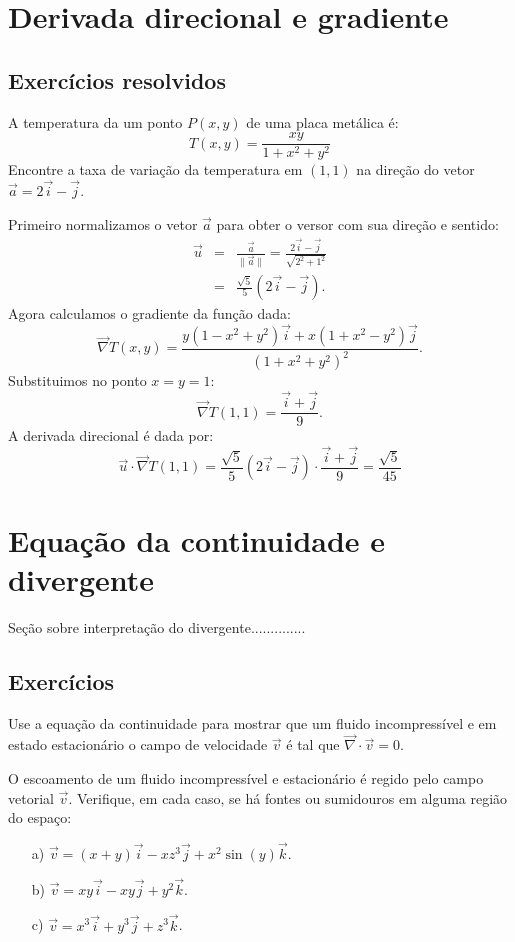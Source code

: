 \section{Derivada direcional e gradiente}


\subsection*{Exercícios resolvidos}
\begin{exeresol}
A temperatura da um ponto $P(x, y)$ de uma placa metálica é:
$$T(x, y) = \frac{xy}{1+x^2+y^2}$$
Encontre a taxa de variação da temperatura em $(1, 1)$ na direção do vetor $\vec{a}=2\vec{i}-\vec{j}$.
\end{exeresol}
\begin{resol}
Primeiro normalizamos o vetor $\vec{a}$ para obter o versor com sua direção e sentido:
\begin{eqnarray*}
\vec{u}&=&\frac{\vec{a}}{\|\vec{a}\|}=\frac{2\vec{i}-\vec{j}}{\sqrt{2^2+1^2}}\\
&=&\frac{\sqrt{5}}{5}\left(2\vec{i}-\vec{j}\right).
\end{eqnarray*}
Agora calculamos o gradiente da função dada:
$$\vec{\nabla}T(x, y) = \frac{y(1-x^2+y^2)\vec{i} + x(1+x^2-y^2)\vec{j}}{\left(1+x^2+y^2\right)^2}.$$
Substituimos no ponto $x=y=1$:
$$\vec{\nabla}T(1, 1) = \frac{\vec{i} + \vec{j}}{9}.$$
A derivada direcional é dada por:
$$\vec{u}\cdot\vec{\nabla}T(1,1) = \frac{\sqrt{5}}{5}\left(2\vec{i}-\vec{j}\right)\cdot \frac{\vec{i} + \vec{j}}{9}=\frac{\sqrt{5}}{45}$$
\end{resol}

\section{Equação da continuidade e divergente}
Seção sobre interpretação do divergente..............


\subsection*{Exercícios}
\begin{exer}
Use a equação da continuidade para mostrar que um fluido incompressível e em estado estacionário o campo de velocidade $\vec{v}$ é tal que $\vec{\nabla}\cdot \vec{v}=0$.
\end{exer}
\begin{exer}
 O escoamento de um fluido incompressível e estacionário é regido pelo campo vetorial $\vec{v}$. Verifique, em cada caso, se há fontes ou sumidouros em alguma região do espaço:
 \begin{itemize}
  \item[a)] $\vec{v}=(x+y)\vec{i}-xz^3\vec{j}+x^2\sin(y)\vec{k}$. 
  \item[b)] $\vec{v}=xy\vec{i}-xy\vec{j}+y^2\vec{k}$.
  \item[c)] $\vec{v}=x^3\vec{i}+y^3\vec{j}+z^3\vec{k}$. 

  \end{itemize}

\end{exer}



